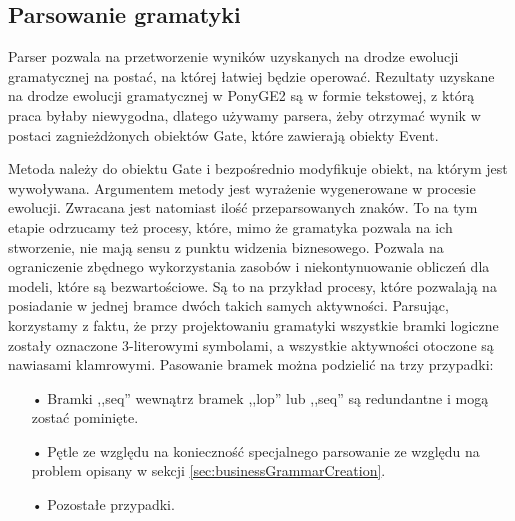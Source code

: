 \subsection{Parsowanie gramatyki}
Parser pozwala na przetworzenie wyników uzyskanych na drodze ewolucji gramatycznej na postać, na której łatwiej będzie operować. Rezultaty uzyskane na drodze ewolucji gramatycznej w PonyGE2 są w formie tekstowej, z którą praca byłaby niewygodna, dlatego używamy parsera, żeby otrzymać wynik w postaci zagnieżdżonych obiektów Gate, które zawierają obiekty Event.

Metoda należy do obiektu Gate i bezpośrednio modyfikuje obiekt, na którym jest wywoływana. Argumentem metody jest wyrażenie wygenerowane w procesie ewolucji. Zwracana jest natomiast ilość przeparsowanych znaków. To na tym etapie odrzucamy też procesy, które, mimo że gramatyka pozwala na ich stworzenie, nie mają sensu z punktu widzenia biznesowego. Pozwala na ograniczenie zbędnego wykorzystania zasobów i niekontynuowanie obliczeń dla modeli, które są bezwartościowe. Są to na przykład procesy, które pozwalają na posiadanie w jednej bramce dwóch takich samych aktywności. Parsując, korzystamy z faktu, że przy projektowaniu gramatyki wszystkie bramki logiczne zostały oznaczone 3-literowymi symbolami, a wszystkie aktywności otoczone są nawiasami klamrowymi. Pasowanie bramek można podzielić na trzy przypadki:
\begin{itemize}   
  \item[•] Bramki ,,seq'' wewnątrz bramek ,,lop'' lub ,,seq'' są redundantne i mogą zostać pominięte.
  \item[•] Pętle ze względu na konieczność specjalnego parsowanie ze względu na problem opisany w sekcji \ref{sec:businessGrammarCreation}.
  \item[•] Pozostałe przypadki.
\end{itemize}


